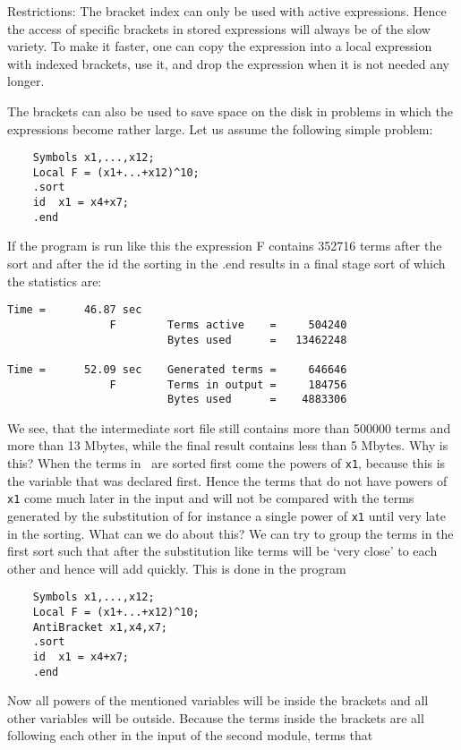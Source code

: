 \noindent
Restrictions: The bracket index can only be used with active expressions. 
Hence the access of specific brackets in stored expressions will always be 
of the slow variety. To make it faster, one can copy the expression into a 
local expression with indexed brackets, use it, and drop the expression 
when it is not needed any longer.

The brackets can also be used to save space on the disk in problems in 
which the expressions become rather large. Let us assume the following 
simple problem:
\begin{verbatim}
    Symbols x1,...,x12;
    Local F = (x1+...+x12)^10;
    .sort
    id  x1 = x4+x7;
    .end
\end{verbatim}
If the program is run like this the expression F contains 352716 terms 
after the sort and after the id the sorting in the .end results in a final 
stage sort of which the statistics are:
\begin{verbatim}
Time =      46.87 sec
                F        Terms active    =     504240
                         Bytes used      =   13462248

Time =      52.09 sec    Generated terms =     646646
                F        Terms in output =     184756
                         Bytes used      =    4883306
\end{verbatim}
We see, that the intermediate sort file still contains more than 500000 
terms and more than 13 Mbytes, while the final result contains less than 5 
Mbytes. Why is this? When the terms in \FORM\ are sorted first come the 
powers of \verb:x1:, because this is the variable that was declared first. 
Hence the terms that do not have powers of \verb:x1: come much later in the 
input and will not be compared with the terms generated by the substitution 
of for instance a single power of \verb:x1: until very late in the sorting. 
What can we do about this? We can try to group the terms in the first sort 
such that after the substitution like terms will be `very close' to each 
other and hence will add quickly. This is done in the program
\begin{verbatim}
    Symbols x1,...,x12;
    Local F = (x1+...+x12)^10;
    AntiBracket x1,x4,x7;
    .sort
    id  x1 = x4+x7;
    .end
\end{verbatim}
Now all powers of the mentioned variables will be inside the brackets and 
all other variables will be outside. Because the terms inside the brackets 
are all following each other in the input of the second module, terms that 
